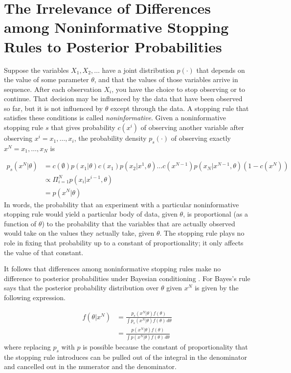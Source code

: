 \documentclass{article}
\theoremstyle{definition}
\begin{document}
\section{The Irrelevance of Differences among Noninformative Stopping Rules to Posterior Probabilities}\label{sec:posteriors}

Suppose the variables $X_1,X_2,\ldots$ have a joint distribution $p(\cdot)$ that depends on the value of some parameter $\theta$, and that the values of those variables arrive in sequence.
After each observation $X_i$, you have the choice to stop observing or to continue.
That decision may be influenced by the data that have been observed so far, but it is not influenced by $\theta$ except through the data.
A stopping rule that satisfies these conditions is called \textit{noninformative}.
Given a noninformative stopping rule $s$ that gives probability $c(x^i)$ of observing another variable after observing $x^i=x_1,\ldots,x_i$, the probability density $p_s(\cdot)$ of observing exactly $x^N=x_1,\ldots,x_N$ is

\begin{align*}
p_s(x^N|\theta)&=c(\emptyset)p(x_1|\theta)c(x_1)p(x_2|x^1,\theta)\ldots c(x^{N-1})p(x_N|x^{N-1},\theta)(1-c(x^N))\\
&\propto \Pi_{i=1}^N p(x_i|x^{i-1},\theta)\\
&=p(x^N|\theta)
\end{align*}
In words, the probability that an experiment with a particular noninformative stopping rule would yield a particular body of data, given $\theta$, is proportional (as a function of $\theta$) to the probability that the variables that are actually observed would take on the values they actually take, given $\theta$.
The stopping rule plays no role in fixing that probability up to a constant of proportionality; it only affects the value of that constant.

It follows that differences among noninformative stopping rules make no difference to posterior probabilities under Bayesian conditioning \citep[37--8]{raiffa+schlaifer61}.
For Bayes's rule says that the posterior probability distribution over $\theta$ given $x^N$ is given by the following expression.

\begin{align*}
f(\theta|x^N)&=\frac{p_s(x^N|\theta)f(\theta)}{\int p_s(x^N|\theta)f(\theta)\,d\theta}\\
&=\frac{p(x^N|\theta)f(\theta)}{\int p(x^N|\theta)f(\theta)\,d\theta}
\end{align*}
where replacing $p_s$ with $p$ is possible because the constant of proportionality that the stopping rule introduces can be pulled out of the integral in the denominator and cancelled out in the numerator and the denominator.
\end{document}
